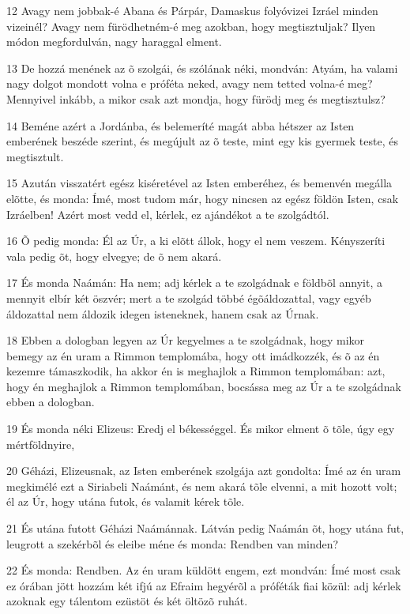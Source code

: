 \par 12 Avagy nem jobbak-é Abana és Párpár, Damaskus folyóvizei Izráel minden vizeinél? Avagy nem fürödhetném-é meg azokban, hogy megtisztuljak? Ilyen módon megfordulván, nagy haraggal elment.
\par 13 De hozzá menének az õ szolgái, és szólának néki, mondván: Atyám, ha valami nagy dolgot mondott volna e próféta neked, avagy nem tetted volna-é meg? Mennyivel inkább, a mikor csak azt mondja, hogy fürödj meg és megtisztulsz?
\par 14 Beméne azért a Jordánba, és belemeríté magát abba hétszer az Isten emberének beszéde szerint, és megújult az õ teste, mint egy kis gyermek teste, és megtisztult.
\par 15 Azután visszatért egész kiséretével az Isten emberéhez, és bemenvén megálla elõtte, és monda: Ímé, most tudom már, hogy nincsen az egész földön Isten, csak Izráelben! Azért most vedd el, kérlek, ez ajándékot a te szolgádtól.
\par 16 Õ pedig monda: Él az Úr, a ki elõtt állok, hogy el nem veszem. Kényszeríti vala pedig õt, hogy elvegye; de õ nem akará.
\par 17 És monda Naámán: Ha nem; adj kérlek a te szolgádnak e földbõl annyit, a mennyit elbír két öszvér; mert a te szolgád többé égõáldozattal, vagy egyéb áldozattal nem áldozik idegen isteneknek, hanem csak az Úrnak.
\par 18 Ebben a dologban legyen az Úr kegyelmes a te szolgádnak, hogy mikor bemegy az én uram a Rimmon templomába, hogy ott imádkozzék, és õ az én kezemre támaszkodik, ha akkor én is meghajlok a Rimmon templomában: azt, hogy én meghajlok a Rimmon templomában, bocsássa meg az Úr a te szolgádnak ebben a dologban.
\par 19 És monda néki Elizeus: Eredj el békességgel. És mikor elment õ tõle, úgy egy mértföldnyire,
\par 20 Géházi, Elizeusnak, az Isten emberének szolgája azt gondolta: Ímé az én uram megkimélé ezt a Siriabeli Naámánt, és nem akará tõle elvenni, a mit hozott volt; él az Úr, hogy utána futok, és valamit kérek tõle.
\par 21 És utána futott Géházi Naámánnak. Látván pedig Naámán õt, hogy utána fut, leugrott a szekérbõl és eleibe méne és monda: Rendben van minden?
\par 22 És monda: Rendben. Az én uram küldött engem, ezt mondván: Ímé most csak ez órában jött hozzám két ifjú az Efraim hegyérõl a próféták fiai közül: adj kérlek azoknak egy tálentom ezüstöt és két öltözõ ruhát.

